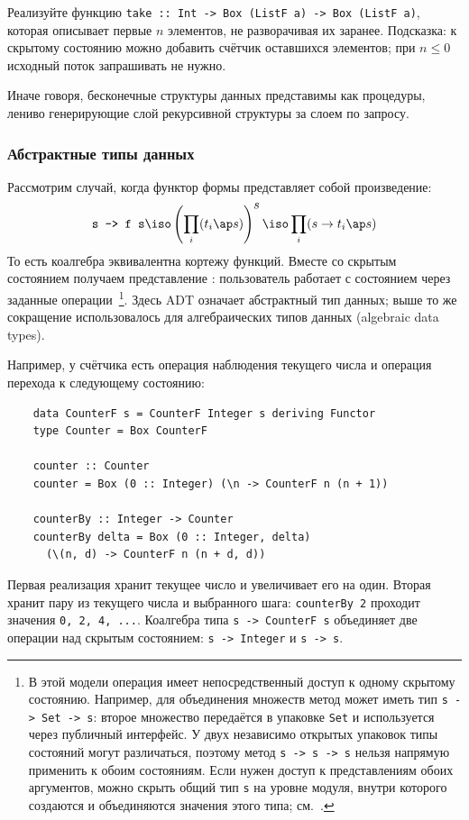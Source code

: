 \begin{task}
    Реализуйте функцию \texttt{take :: Int -> Box (ListF a) -> Box (ListF a)}, которая описывает первые $n$ элементов, не разворачивая их заранее.
    Подсказка: к скрытому состоянию можно добавить счётчик оставшихся элементов; при $n\leq 0$ исходный поток запрашивать не нужно.
\end{task}

Иначе говоря, бесконечные структуры данных представимы как процедуры, лениво генерирующие слой рекурсивной структуры за слоем по запросу.

\subsubsection{Абстрактные типы данных} \label{subsubsec:abstract-data-types}

Рассмотрим случай, когда функтор формы представляет собой произведение:
\[
    \text{\texttt{s -> f s}} \iso \left( \prod_{i}(t_i\ap s) \right)^{\displaystyle s} \iso \prod_i(s\to t_i\ap s)
\]
То есть коалгебра эквивалентна кортежу функций.
Вместе со скрытым состоянием получаем представление : пользователь работает с состоянием через заданные операции~\cite{gibbons2008unfolding}\footnote{В этой модели операция имеет непосредственный доступ к одному скрытому состоянию. Например, для объединения множеств метод может иметь тип \texttt{s -> Set -> s}: второе множество передаётся в упаковке \texttt{Set} и используется через публичный интерфейс. У двух независимо открытых упаковок типы состояний могут различаться, поэтому метод \texttt{s -> s -> s} нельзя напрямую применить к обоим состояниям. Если нужен доступ к представлениям обоих аргументов, можно скрыть общий тип \texttt{s} на уровне модуля, внутри которого создаются и объединяются значения этого типа; см.~\cite[разделы 2.1--2.3]{gibbons2008unfolding}.}.
Здесь ADT означает абстрактный тип данных; выше то же сокращение использовалось для алгебраических типов данных (algebraic data types).

Например, у счётчика есть операция наблюдения текущего числа и операция перехода к следующему состоянию:
\begin{verbatim}
    data CounterF s = CounterF Integer s deriving Functor
    type Counter = Box CounterF

    counter :: Counter
    counter = Box (0 :: Integer) (\n -> CounterF n (n + 1))

    counterBy :: Integer -> Counter
    counterBy delta = Box (0 :: Integer, delta)
      (\(n, d) -> CounterF n (n + d, d))
\end{verbatim}
Первая реализация хранит текущее число и увеличивает его на один.
Вторая хранит пару из текущего числа и выбранного шага: \texttt{counterBy 2} проходит значения \texttt{0, 2, 4, ...}.
Коалгебра типа \texttt{s -> CounterF s} объединяет две операции над скрытым состоянием: \texttt{s -> Integer} и \texttt{s -> s}.

